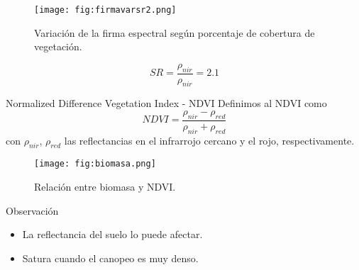\begin{frame}{}
  \begin{figure}
    \centering
    \texttt{[image: fig:firmavarsr2.png]}
    \caption{Variación de la firma espectral según porcentaje de cobertura de vegetación.}
    \label{}
  \end{figure}
\end{frame}

\begin{frame}
\begin{equation}
    SR = \frac{\rho_{nir}}{\rho_{nir}} = 2.1
  \end{equation}
  \end{frame}

\begin{frame}{}
\begin{block}{Normalized Difference Vegetation Index - NDVI}
  Definimos al NDVI como
  \begin{equation}
    NDVI = \frac{\rho_{nir}-\rho_{red}}{\rho_{nir}+\rho_{red}}
  \end{equation}
  con $\rho_{nir}$, $\rho_{red}$ las reflectancias en el infrarrojo cercano y el rojo, respectivamente.
\end{block}
\end{frame}


\begin{frame}{}
  \begin{figure}
    \centering
    \texttt{[image: fig:biomasa.png]}
    \caption{Relación entre biomasa y NDVI.}
    \label{}
  \end{figure}
\end{frame}
\begin{frame}
\begin{block}{Observación}
    \begin{itemize}[<+->]
        \item La reflectancia del suelo lo puede afectar.
        \item Satura cuando el canopeo es muy denso.
    \end{itemize}
\end{block}
\end{frame}


